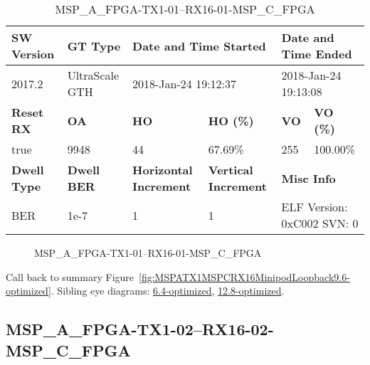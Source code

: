 \begin{table}[h]
\centering
\caption{MSP\_A\_FPGA-TX1-01--RX16-01-MSP\_C\_FPGA}
\label{tab:MSPAFPGATX101RX1601MSPCFPGA9.6-optimized}
\begin{tabular}{@{}|l|l|l|l|l|l|@{}}
\toprule
\textbf{SW Version}                & \textbf{GT Type}   & \multicolumn{2}{l|}{\textbf{Date and Time Started}}            & \multicolumn{2}{l|}{\textbf{Date and Time Ended}}        \\ \midrule
2017.2                       & UltraScale GTH          & \multicolumn{2}{l|}{2018-Jan-24 19:12:37}                   & \multicolumn{2}{l|}{2018-Jan-24 19:13:08}               \\ \midrule
\textbf{Reset RX}                  & \textbf{OA} & \textbf{HO}   & \textbf{HO (\%)} & \textbf{VO} & \textbf{VO (\%)} \\ \midrule
true & 9948        & 44          & 67.69\%        & 255        & 100.00\%       \\ \midrule
\textbf{Dwell Type}                & \textbf{Dwell BER} & \textbf{Horizontal Increment} & \textbf{Vertical Increment}    & \multicolumn{2}{l|}{\textbf{Misc Info}}                  \\ \midrule
BER                            & 1e-7        & 1        & 1           & \multicolumn{2}{l|}{ELF Version: 0xC002 SVN: 0}                         \\ \bottomrule
\end{tabular}
\end{table}

\begin{figure}[h]
\caption{MSP\_A\_FPGA-TX1-01--RX16-01-MSP\_C\_FPGA} \label{fig:MSPAFPGATX101RX1601MSPCFPGA9.6-optimized}
\end{figure}

Call back to summary Figure~\ref{fig:MSPATX1MSPCRX16MinipodLoopback9.6-optimized}.
Sibling eye diagrams: \hyperref[sec:MSPAFPGATX101RX1601MSPCFPGA6.4-optimized]{6.4-optimized}, \hyperref[sec:MSPAFPGATX101RX1601MSPCFPGA12.8-optimized]{12.8-optimized}.

\clearpage
\newpage


\subsection{MSP\_A\_FPGA-TX1-02--RX16-02-MSP\_C\_FPGA}\label{sec:MSPAFPGATX102RX1602MSPCFPGA9.6-optimized}

